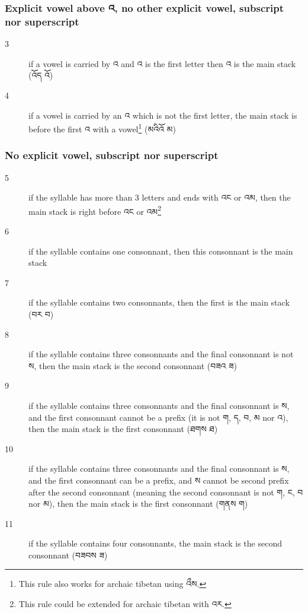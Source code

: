 \documentclass[%
a4paper,%
pagesize,%
12pt,%
parskip=off,%
bibliography=totoc,%
numbers=noenddot,%
DIV=12,%
twoside=semi,%
headings=normal%
]{scrartcl}
\begin{document}
\subsubsection*{Explicit vowel above འ, no other explicit vowel, subscript nor superscript}

\begin{description}
\item[3] if a vowel is carried by འ and འ is the first letter then འ is the main stack (འོད \rightarrow{} འོ)
\item[4] if a vowel is carried by an འ which is not the first letter, the main stack is before the first འ with a vowel\footnote{This rule also works for archaic tibetan using འྀས.} (མའིའོ \rightarrow{} མ)
\end{description}

\subsubsection*{No explicit vowel, subscript nor superscript}

\begin{description}
\item[5] if the syllable has more than 3 letters and ends with འང or འམ, then the main stack is right before འང or འམ\footnote{This rule could be extended for archaic tibetan with འར.}
\item[6] if the syllable contains one consonnant, then this consonnant is the main stack
\item[7] if the syllable contains two consonnants, then the first is the main stack (བར \rightarrow{} བ)
\item[8] if the syllable contains three consonnants and the final consonnant is not ས, then the main stack is the second consonnant (བཟའ \rightarrow{} ཟ)
\item[9] if the syllable contains three consonnants and the final consonnant is ས, and the first consonnant cannot be a prefix (it is not ག, ད, བ, མ nor འ), then the main stack is the first consonnant (ཐགས \rightarrow{} ཐ)
\item[10] if the syllable contains three consonnants and the final consonnant is ས, and the first consonnant can be a prefix, and ས cannot be second prefix after the second consonnant (meaning the second consonnant is not ག, ང, བ nor མ), then the main stack is the first consonnant (གནས \rightarrow{} ག)
\item[11] if the syllable contains four consonnants, the main stack is the second consonnant (བཟབས \rightarrow{} ཟ)
\end{description}
\end{document}
